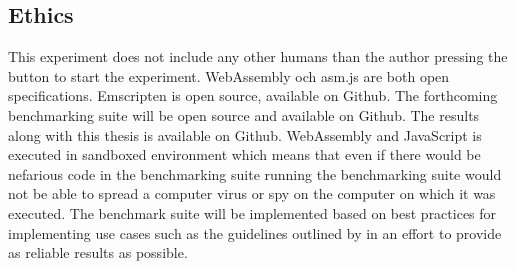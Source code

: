\subsection{Ethics}

This experiment does not include any other humans than the author pressing the button to start the experiment. WebAssembly och asm.js are both open specifications. Emscripten is open source, available on Github. The forthcoming benchmarking suite will be open source and available on Github. The results along with this thesis is available on Github. WebAssembly and JavaScript is executed in sandboxed environment which means that even if there would be nefarious code in the benchmarking suite running the benchmarking suite would not be able to spread a computer virus or spy on the computer on which it was executed. The benchmark suite will be implemented based on best practices for implementing use cases such as the guidelines outlined by \textcite{CaiNerurkarWu1998} in an effort to provide as reliable results as possible.
